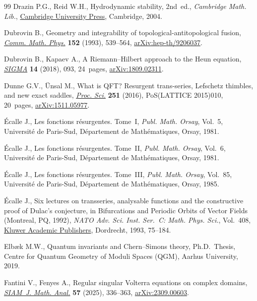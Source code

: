 \documentclass[pdftex]{sigma}
\numberwithin{equation}{section}
\begin{document}
\begin{thebibliography}{99}
Drazin P.G., Reid W.H., Hydrodynamic stability, 2nd~ed., \textit{Cambridge Math. Lib.},
 \href{https://doi.org/10.1017/CBO9780511616938}{Cambridge University Press},
 Cambridge, 2004.

Dubrovin B., Geometry and integrability of topological-antitopological fusion,
 \href{https://doi.org/10.1007/BF02096618}{\textit{Comm. Math. Phys.}}
 \textbf{152} (1993), 539--564,
 \href{http://arxiv.org/abs/hep-th/9206037}{arXiv:hep-th/9206037}.

Dubrovin B., Kapaev A., A {R}iemann--{H}ilbert approach to the {H}eun equation,
 \href{https://doi.org/10.3842/SIGMA.2018.093}{\textit{SIGMA}} \textbf{14}
 (2018), 093, 24~pages,
 \href{http://arxiv.org/abs/1809.02311}{arXiv:1809.02311}.

Dunne G.V., \"Unsal M., What is QFT? Resurgent trans-series, Lefschetz
 thimbles, and new exact saddles,
 \href{https://doi.org/10.22323/1.251.0010}{\textit{Proc. Sci.}} \textbf{251}
 (2016), PoS(LATTICE 2015)010, 20~pages,
 \href{http://arxiv.org/abs/1511.05977}{arXiv:1511.05977}.

{\'E}calle J., Les fonctions r\'esurgentes. {T}ome~{I}, \textit{Publ. Math.
 Orsay}, Vol.~5, Universit\'e de Paris-Sud, D\'epartement de Math\'ematiques,
 Orsay, 1981.

{\'E}calle J., Les fonctions r\'esurgentes. {T}ome~{II}, \textit{Publ. Math.
 Orsay}, Vol.~6, Universit\'e de Paris-Sud, D\'epartement de Math\'ematiques,
 Orsay, 1981.

{\'E}calle J., Les fonctions r\'esurgentes. {T}ome~{III}, \textit{Publ. Math.
 Orsay}, Vol.~85, Universit\'e de Paris-Sud, D\'epartement de Math\'ematiques,
 Orsay, 1985.

{\'E}calle J., Six lectures on transseries, analysable functions and the
 constructive proof of {D}ulac's conjecture, in Bifurcations and {P}eriodic
 {O}rbits of {V}ector {F}ields ({M}ontreal, {PQ}, 1992), \textit{NATO Adv.
 Sci. Inst. Ser.~C: Math. Phys. Sci.}, Vol.~408,
 \href{https://doi.org/10.1007/978-94-015-8238-4_3}{Kluwer Academic
 Publishers}, Dordrecht, 1993, 75--184.

Elb{\ae}k M.W., Quantum invariants and {C}hern--{S}imons theory, Ph.D.~Thesis,
 {C}entre for Quantum Geometry of Moduli Spaces (QGM), Aarhus University,
 2019.

Fantini V., Fenyes A., Regular singular {V}olterra equations on complex
 domains, \href{https://doi.org/10.1137/23M1613876}{\textit{SIAM~J. Math.
 Anal.}} \textbf{57} (2025), 336--363,
 \href{http://arxiv.org/abs/2309.00603}{arXiv:2309.00603}.


\end{thebibliography}
\end{document}
